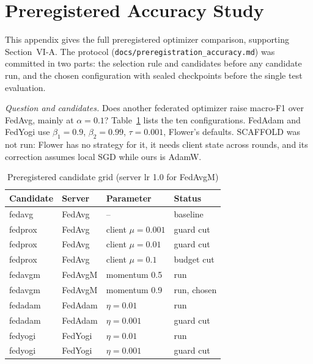 \section{Preregistered Accuracy Study}
\label{app:prereg}
This appendix gives the full preregistered optimizer comparison, supporting
Section~VI-A. The protocol (\texttt{docs/preregistration\_accuracy.md}) was committed in
two parts: the selection rule and candidates before any candidate run, and the chosen
configuration with sealed checkpoints before the single test evaluation.

\emph{Question and candidates.} Does another federated optimizer raise macro-F1 over
FedAvg, mainly at $\alpha=0.1$? Table~\ref{tab:prereggrid} lists the ten configurations. %
FedAdam and FedYogi use $\beta_1=0.9$, $\beta_2=0.99$, $\tau=0.001$, Flower's defaults. %
SCAFFOLD was not run: Flower has no strategy for it, it needs client state across rounds,
and its correction assumes local SGD while ours is AdamW.

\begin{table}[h]
\centering
\caption{Preregistered candidate grid (server lr 1.0 for FedAvgM)} %
\label{tab:prereggrid}
\footnotesize
\begin{tabular}{@{}llll@{}}
\toprule
Candidate & Server & Parameter & Status\\
\midrule
fedavg & FedAvg & -- & baseline\\
fedprox & FedAvg & client $\mu=0.001$ & guard cut\\ %
fedprox & FedAvg & client $\mu=0.01$ & guard cut\\ %
fedprox & FedAvg & client $\mu=0.1$ & budget cut\\ %
fedavgm & FedAvgM & momentum 0.5 & run\\ %
fedavgm & FedAvgM & momentum 0.9 & run, chosen\\ %
fedadam & FedAdam & $\eta=0.01$ & run\\ %
fedadam & FedAdam & $\eta=0.001$ & guard cut\\ %
fedyogi & FedYogi & $\eta=0.01$ & run\\ %
fedyogi & FedYogi & $\eta=0.001$ & guard cut\\ %
\bottomrule
\end{tabular}
\end{table}


